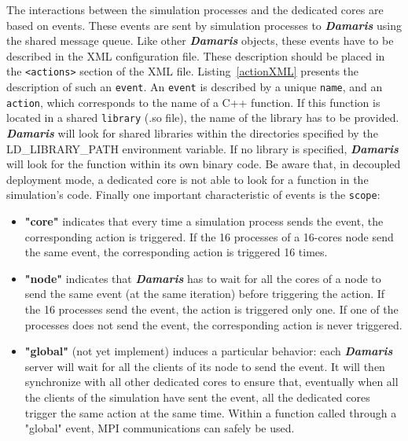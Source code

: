 \documentclass[11pt]{report}
\newcommand{\Damaris}{\emph{\textbf{Damaris}}}
\begin{document}
The interactions between the simulation processes and the dedicated cores are based on events.
These events are sent by simulation processes to \Damaris{} using the shared message queue.
Like other \Damaris{} objects, these events have to be described in the XML configuration file.
These description should be placed in the \texttt{<actions>} section of the XML file.
Listing~\ref{actionXML} presents the description of such an \texttt{event}.
An \texttt{event} is described by a unique \texttt{name}, and an \texttt{action}, which corresponds to
the name of a C++ function. If this function is located in a shared \texttt{library} (.so file), the name
of the library has to be provided. \Damaris{} will look for shared libraries within the directories
specified by the LD\_LIBRARY\_PATH environment variable. If no library is specified, \Damaris{}
will look for the function within its own binary code. Be aware that, in decoupled deployment mode,
a dedicated core is not able to look for a function in the simulation's code.
Finally one important characteristic of events is the \texttt{scope}:
\begin{itemize}
	\item \textbf{"core"} indicates that every time a simulation process sends the event, the
	corresponding action is triggered. If the 16 processes of a 16-cores node 
	send the same event, the corresponding action is triggered 16 times.
	\item \textbf{"node"} indicates that \Damaris{} has to wait for all the cores of a node to send
	the same event (at the same iteration) before triggering the action. If the 16 processes
	send the event, the action is triggered only one. If one of the processes does not send the
	event, the corresponding action is never triggered.
	\item \textbf{"global"} (not yet implement) induces a particular behavior: each \Damaris{} 
	server will wait for all the clients of its node to send the event. It will then synchronize with
	all other dedicated cores to ensure that, eventually when all the clients of the simulation
	have sent the event, all the dedicated cores trigger the same action at the same time.
	Within a function called through a "global" event, MPI communications can safely be used.
\end{itemize}

\noindent\begin{minipage}{\textwidth}
\vspace{0.5cm}

\end{minipage}
\end{document}
